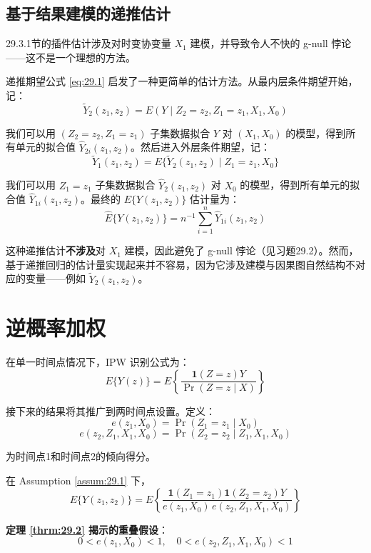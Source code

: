 \subsection{基于结果建模的递推估计}\label{sec:29-3-2}

29.3.1节的插件估计涉及对时变协变量 $X_1$ 建模，并导致令人不快的 g-null 悖论——这不是一个理想的方法。

递推期望公式 \ref{eq:29.1} 启发了一种更简单的估计方法。从最内层条件期望开始，记：
\[
\tilde{Y}_2(z_1, z_2) = E(Y \mid Z_2 = z_2, Z_1 = z_1, X_1, X_0)
\]

我们可以用 $(Z_2 = z_2, Z_1 = z_1)$ 子集数据拟合 $Y$ 对 $(X_1, X_0)$ 的模型，得到所有单元的拟合值 $\hat{Y}_{2i}(z_1, z_2)$。然后进入外层条件期望，记：
\[
\tilde{Y}_1(z_1, z_2) = E\{\tilde{Y}_2(z_1, z_2) \mid Z_1 = z_1, X_0\}
\]

我们可以用 $Z_1 = z_1$ 子集数据拟合 $\hat{Y}_2(z_1, z_2)$ 对 $X_0$ 的模型，得到所有单元的拟合值 $\hat{Y}_{1i}(z_1, z_2)$。最终的 $E\{Y(z_1, z_2)\}$ 估计量为：
\[
\hat{E}\{Y(z_1, z_2)\} = n^{-1} \sum_{i=1}^n \hat{Y}_{1i}(z_1, z_2)
\tag{29.11}
\]

这种递推估计\textbf{不涉及}对 $X_1$ 建模，因此避免了 g-null 悖论（见习题29.2）。然而，基于递推回归的估计量实现起来并不容易，因为它涉及建模与因果图自然结构不对应的变量——例如 $\tilde{Y}_2(z_1, z_2)$。

\section{逆概率加权}\label{sec:29-4}

在单一时间点情况下，IPW 识别公式为：
\[
E\{Y(z)\} = E\left\{ \frac{\mathbf{1}(Z = z) Y}{\Pr(Z = z \mid X)} \right\}
\]

接下来的结果将其推广到两时间点设置。定义：
\[
e(z_1, X_0) = \Pr(Z_1 = z_1 \mid X_0)
\tag{29.12}
\]
\[
e(z_2, Z_1, X_1, X_0) = \Pr(Z_2 = z_2 \mid Z_1, X_1, X_0)
\tag{29.13}
\]

为时间点1和时间点2的倾向得分。

\begin{Theorem}\label{thrm:29.2}
在 Assumption \ref{assum:29.1} 下，
\[
E\{Y(z_1, z_2)\} = E\left\{ \frac{\mathbf{1}(Z_1 = z_1) \mathbf{1}(Z_2 = z_2) Y}{e(z_1, X_0) \, e(z_2, Z_1, X_1, X_0)} \right\}
\label{eq:29.14}
\tag{29.14}
\]
\end{Theorem}

\textbf{定理 \ref{thrm:29.2} 揭示的重叠假设}：
\[
0 < e(z_1, X_0) < 1, \quad 0 < e(z_2, Z_1, X_1, X_0) < 1
\label{eq:29.15}
\tag{29.15}
\]

